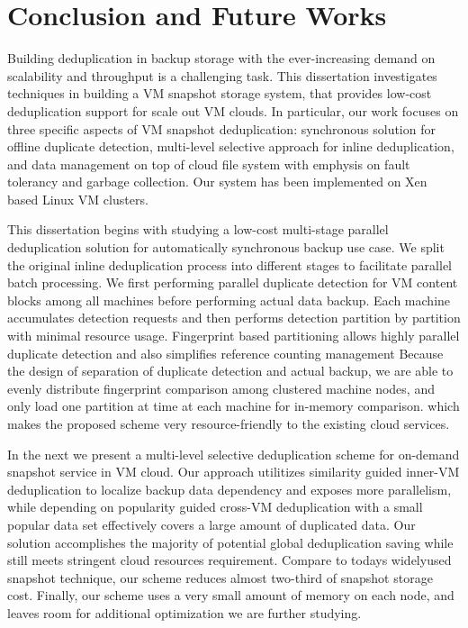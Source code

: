 \chapter{Conclusion and Future Works}
\label{chap:concl}
Building deduplication in backup storage with the ever-increasing demand on 
scalability and throughput is a challenging  task.  This dissertation investigates 
techniques in building a VM snapshot storage system, that provides low-cost
deduplication support for scale out VM clouds.  In particular, our work focuses on 
three specific  aspects  of VM snapshot deduplication: synchronous solution for offline duplicate detection,
multi-level selective approach for inline deduplication, and data management on top of
cloud file system with emphysis on fault tolerancy and garbage collection.
Our system  has  been  implemented on Xen based Linux VM clusters.

This dissertation begins with studying a low-cost multi-stage
parallel deduplication solution for automatically synchronous backup use case. 
We split the original inline deduplication process into different stages to
facilitate parallel batch processing.
We first performing parallel duplicate detection for VM content blocks among all
machines before performing actual data backup. Each
machine accumulates detection requests and then performs 
detection partition by partition with minimal resource usage. 
Fingerprint based partitioning allows
highly parallel duplicate detection and also simplifies
reference counting management
Because the design of separation
of duplicate detection and actual backup, we are able
to evenly distribute fingerprint comparison among clustered machine nodes, 
and only load one partition at time
at each machine for in-memory comparison.
which makes the proposed scheme very resource-friendly 
to the existing cloud services.

In the next we present a multi-level selective deduplication scheme for 
on-demand snapshot service in VM cloud. Our approach utilitizes similarity guided inner-VM
deduplication to localize backup data dependency and exposes
more parallelism, while depending on popularity guided cross-VM deduplication 
with a small
popular data set effectively covers a large amount of duplicated data. 
Our solution accomplishes the majority of potential
global deduplication saving while still meets stringent cloud
resources requirement. Compare to todays widelyused snapshot technique, 
our scheme reduces almost two-third
of snapshot storage cost. Finally, our scheme uses a very
small amount of memory on each node, and leaves room for
additional optimization we are further studying.

